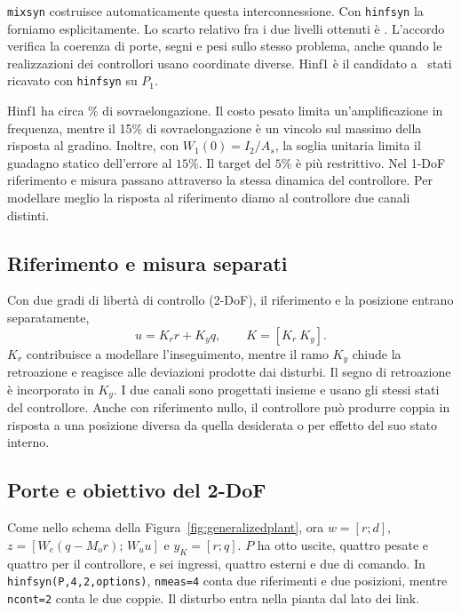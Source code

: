 \texttt{mixsyn} costruisce automaticamente questa interconnessione.
Con \texttt{hinfsyn} la forniamo esplicitamente. Lo scarto relativo
fra i due livelli ottenuti è \FinScartoMixsyn. L'accordo verifica
la coerenza di porte, segni e pesi sullo stesso problema, anche
quando le realizzazioni dei controllori usano coordinate diverse.
Hinf1 è il candidato a \FinHinfOneOrdine\ stati ricavato con
\texttt{hinfsyn} su $P_1$.

Hinf1 ha circa \FinHinfOneMp\% di sovraelongazione. Il costo
pesato limita un'amplificazione in frequenza, mentre il 15\% di
sovraelongazione è un vincolo sul massimo della risposta al gradino.
Inoltre, con $W_1(0)=I_2/A_s$, la soglia unitaria limita il
guadagno statico dell'errore al $15\%$. Il target del $5\%$ è
più restrittivo. Nel 1-DoF
riferimento e misura passano attraverso la stessa dinamica del
controllore. Per modellare meglio la risposta al riferimento
diamo al controllore due canali distinti.

\subsection{Riferimento e misura separati}

Con due gradi di libertà di controllo (2-DoF), il riferimento
e la posizione entrano separatamente,
\[
 u=K_r r+K_y q,\qquad K=[K_r\ K_y].
\]
$K_r$ contribuisce a modellare l'inseguimento, mentre il ramo
$K_y$ chiude la retroazione e reagisce alle deviazioni prodotte
dai disturbi. Il segno di retroazione è incorporato in $K_y$.
I due canali sono progettati insieme e usano gli stessi stati
del controllore. Anche con riferimento nullo, il controllore può
produrre coppia in risposta a una posizione diversa da quella
desiderata o per effetto del suo stato interno.

\subsection{Porte e obiettivo del 2-DoF}

Come nello schema della Figura~\ref{fig:generalizedplant},
ora $w=[r;d]$, $z=[W_e(q-M_or);\,W_uu]$ e $y_K=[r;q]$.
$P$ ha otto uscite, quattro pesate e quattro per il controllore,
e sei ingressi, quattro esterni e due di comando.
In \texttt{hinfsyn(P,4,2,options)}, \texttt{nmeas=4} conta due
riferimenti e due posizioni, mentre \texttt{ncont=2} conta le due
coppie. Il disturbo entra nella pianta dal lato dei link.

